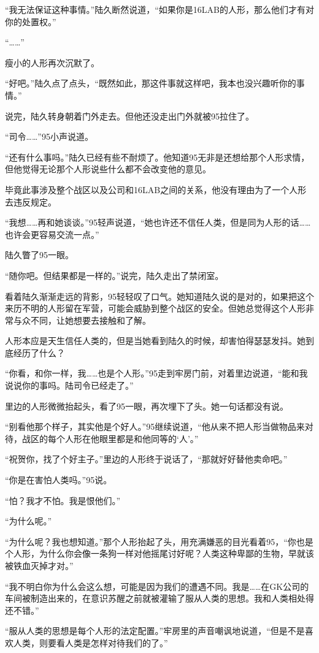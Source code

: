 “我无法保证这种事情。”陆久断然说道，“如果你是16LAB的人形，那么他们才有对你的处置权。”

“……”

瘦小的人形再次沉默了。

“好吧。”陆久点了点头，“既然如此，那这件事就这样吧，我本也没兴趣听你的事情。”

说完，陆久转身朝着门外走去。但他还没走出门外就被95拉住了。

“司令……”95小声说道。

“还有什么事吗。”陆久已经有些不耐烦了。他知道95无非是还想给那个人形求情，但他觉得无论那个人形说些什么都不会改变他的意见。

毕竟此事涉及整个战区以及公司和16LAB之间的关系，他没有理由为了一个人形去违反规定。

“我想……再和她谈谈。”95轻声说道，“她也许还不信任人类，但是同为人形的话……也许会更容易交流一点。”

陆久瞥了95一眼。

“随你吧。但结果都是一样的。”说完，陆久走出了禁闭室。

看着陆久渐渐走远的背影，95轻轻叹了口气。她知道陆久说的是对的，如果把这个来历不明的人形留在军营，可能会威胁到整个战区的安全。但她总觉得这个人形非常与众不同，让她想要去接触和了解。

人形本应是天生信任人类的，但是当她看到陆久的时候，却害怕得瑟瑟发抖。她到底经历了什么？

“你看，和你一样，我……也是个人形。”95走到牢房门前，对着里边说道，“能和我说说你的事吗。陆司令已经走了。”

里边的人形微微抬起头，看了95一眼，再次埋下了头。她一句话都没有说。

“别看他那个样子，其实他是个好人。”95继续说道，“他从来不把人形当做物品来对待，战区的每个人形在他眼里都是和他同等的‘人’。”

“祝贺你，找了个好主子。”里边的人形终于说话了，“那就好好替他卖命吧。”

“你是在害怕人类吗。”95说。

“怕？我才不怕。我是恨他们。”

“为什么呢。”

“为什么呢？我也想知道。”那个人形抬起了头，用充满嫌恶的目光看着95，“你也是个人形，为什么你会像一条狗一样对他摇尾讨好呢？人类这种卑鄙的生物，早就该被铁血灭掉才对。”

“我不明白你为什么会这么想，可能是因为我们的遭遇不同。我是……在GK公司的车间被制造出来的，在意识苏醒之前就被灌输了服从人类的思想。我和人类相处得还不错。”

“服从人类的思想是每个人形的法定配置。”牢房里的声音嘲讽地说道，“但是不是喜欢人类，则要看人类是怎样对待我们的了。”

